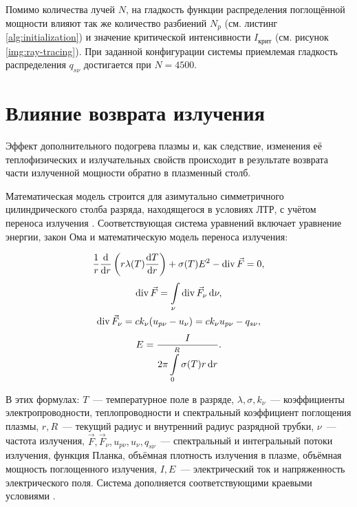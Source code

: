 Помимо количества лучей $N$, на гладкость функции распределения поглощённой мощности влияют так же количество разбиений $N_p$ (см. листинг \ref{alg:initialization}) и значение критической интенсивности $I_{\text{крит}}$ (см. рисунок \ref{img:ray-tracing}).
При заданной конфигурации системы приемлемая гладкость распределения $q_{s\nu}$ достигается при $N = 4500$.

\pagebreak

\section{Влияние возврата излучения}

Эффект дополнительного подогрева плазмы и, как следствие, изменения её теплофизических и излучательных свойств происходит в результате возврата части излученной мощности обратно в плазменный столб.

Математическая модель строится для азимутально симметричного цилиндрического столба разряда, находящегося в условиях ЛТР, с учётом переноса излучения \cite{kerimov-2}.
Соответствующая система уравнений включает уравнение энергии, закон Ома и математическую модель переноса излучения:

\begin{equation}
	\label{eqn:article-1}
	\frac1r\frac{\mathrm d}{\mathrm dr} \left( r \lambda(T) \frac{\mathrm dT}{\mathrm dr} \right) + \sigma(T)E^2 - \operatorname{div}{\vec F = 0},
\end{equation}
\begin{equation}
	\label{eqn:article-2}
	\begin{gathered}
		\operatorname{div}{\vec F} = \int\displaylimits_\nu \operatorname{div}{\vec F_\nu} \,\mathrm d\nu, \\
		\operatorname{div}{\vec F_\nu} = ck_{\nu}(u_{p\nu} - u_{\nu}) = ck_{\nu}u_{p\nu} - q_{s\nu}, \\
	\end{gathered}
\end{equation}
\begin{equation}
	\label{eqn:article-3}
	E = \frac{I}{\displaystyle 2\pi\int\displaylimits_0^R \sigma(T) r\,\mathrm dr}.
\end{equation}

В этих формулах: $T$~— температурное поле в разряде, $\lambda, \sigma, k_\nu$~— коэффициенты электропроводности, теплопроводности и спектральный коэффициент поглощения плазмы, $r, R$~— текущий радиус и внутренний радиус разрядной трубки, $\nu$~— частота излучения, $\vec F, \vec F_\nu, u_{p\nu}, u_{\nu}, q_{s\nu}$~— спектральный и интегральный потоки излучения, функция Планка, объёмная плотность излучения в плазме, объёмная мощность поглощенного излучения, $I, E$~— электрический ток и напряженность электрического поля.
Система дополняется соответствующими краевыми условиями \cite{gradov-dissertation}.

